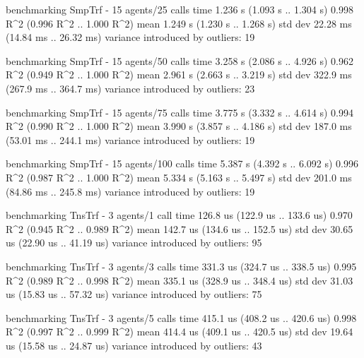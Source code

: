 \begin{showCode}
    benchmarking SmpTrf - 15 agents/25 calls
    time                 1.236 s    (1.093 s .. 1.304 s)
                         0.998 R^2   (0.996 R^2 .. 1.000 R^2)
    mean                 1.249 s    (1.230 s .. 1.268 s)
    std dev              22.28 ms   (14.84 ms .. 26.32 ms)
    variance introduced by outliers: 19%

    benchmarking SmpTrf - 15 agents/50 calls
    time                 3.258 s    (2.086 s .. 4.926 s)
                         0.962 R^2   (0.949 R^2 .. 1.000 R^2)
    mean                 2.961 s    (2.663 s .. 3.219 s)
    std dev              322.9 ms   (267.9 ms .. 364.7 ms)
    variance introduced by outliers: 23%

    benchmarking SmpTrf - 15 agents/75 calls
    time                 3.775 s    (3.332 s .. 4.614 s)
                         0.994 R^2   (0.990 R^2 .. 1.000 R^2)
    mean                 3.990 s    (3.857 s .. 4.186 s)
    std dev              187.0 ms   (53.01 ms .. 244.1 ms)
    variance introduced by outliers: 19%

    benchmarking SmpTrf - 15 agents/100 calls
    time                 5.387 s    (4.392 s .. 6.092 s)
                         0.996 R^2   (0.987 R^2 .. 1.000 R^2)
    mean                 5.334 s    (5.163 s .. 5.497 s)
    std dev              201.0 ms   (84.86 ms .. 245.8 ms)
    variance introduced by outliers: 19%

    benchmarking TnsTrf - 3 agents/1 call
    time                 126.8 us   (122.9 us .. 133.6 us)
                         0.970 R^2   (0.945 R^2 .. 0.989 R^2)
    mean                 142.7 us   (134.6 us .. 152.5 us)
    std dev              30.65 us   (22.90 us .. 41.19 us)
    variance introduced by outliers: 95%

    benchmarking TnsTrf - 3 agents/3 calls
    time                 331.3 us   (324.7 us .. 338.5 us)
                         0.995 R^2   (0.989 R^2 .. 0.998 R^2)
    mean                 335.1 us   (328.9 us .. 348.4 us)
    std dev              31.03 us   (15.83 us .. 57.32 us)
    variance introduced by outliers: 75%

    benchmarking TnsTrf - 3 agents/5 calls
    time                 415.1 us   (408.2 us .. 420.6 us)
                         0.998 R^2   (0.997 R^2 .. 0.999 R^2)
    mean                 414.4 us   (409.1 us .. 420.5 us)
    std dev              19.64 us   (15.58 us .. 24.87 us)
    variance introduced by outliers: 43%


\end{showCode}
